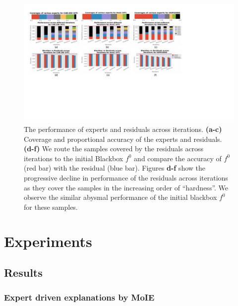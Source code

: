 \documentclass[nohyperref]{article}
\theoremstyle{plain}
\theoremstyle{definition}
\theoremstyle{remark}
\begin{document}
\begin{figure}[ht]
\vskip 0.2in
\begin{center}
\centerline{\includegraphics[width=\linewidth]{figures/main/Expert_res_all.pdf}}
\caption{The performance of experts and residuals across iterations. 
\textbf{(a-c)} Coverage and proportional accuracy of the experts and residuals. 
\textbf{(d-f)} We route the samples covered by the residuals across iterations to the initial Blackbox $f^0$ and compare the accuracy of $f^0$ (red bar) with the residual (blue bar). Figures \textbf{d-f} show the progressive decline in performance of the residuals across iterations as they cover the samples in the increasing order of ``hardness''. We observe the similar abysmal performance of the initial blackbox $f^0$ for these samples.
}
\label{fig:expert_performance_cv_vit}
\end{center}
\vskip -0.2in
\end{figure}


\section{Experiments}


\subsection{Results}
% 

\subsubsection{Expert driven explanations by MoIE }

\end{document}
